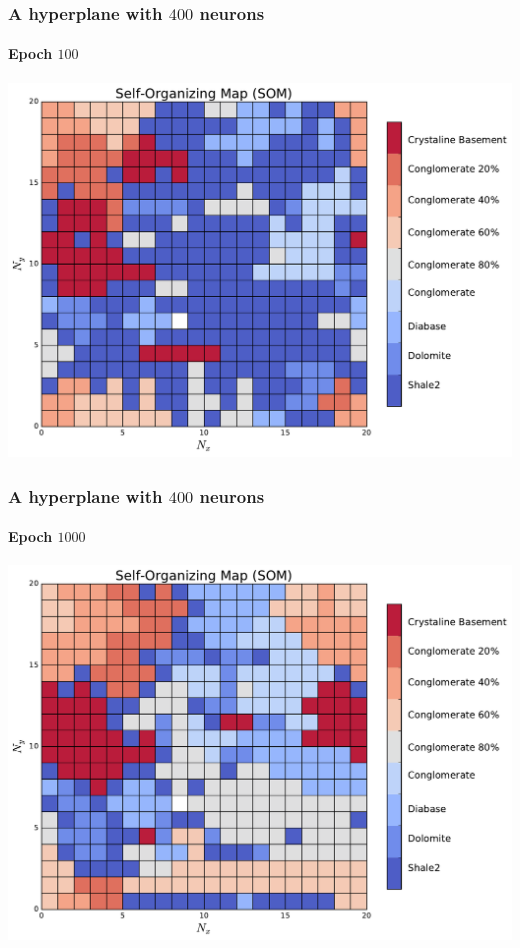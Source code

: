 \documentclass[aspectratio=10]{beamer} %
\begin{document}
\begin{frame}
\frametitle{A hyperplane with $400$ neurons}
\framesubtitle{Epoch $100$}
\centering
\includegraphics[scale=0.4]{Imagens/SOM100.pdf} 
\end{frame}

\begin{frame}
\frametitle{A hyperplane with $400$ neurons}
\framesubtitle{Epoch $1000$}
\centering
\includegraphics[scale=0.4]{Imagens/SOM1000.pdf} 
\end{frame}

\end{document}
